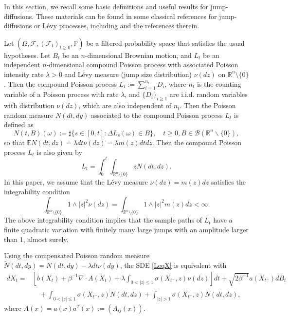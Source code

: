 \documentclass[10pt]{article}
\theoremstyle{definition}
\theoremstyle{remark}
\numberwithin{equation}{section}
\begin{document}
In this section, we recall some basic definitions and useful results for jump-diffusions. These materials can be found in some classical references for jump-diffusions or L\'{e}vy processes, including \cite{A2004, S99, K19} and the references therein.

Let $(\Omega, \mathscr{F}, (\mathscr{F}_t)_{t\geq 0}, \mathbb{P})$ be a filtered probability space that satisfies the usual hypotheses.
Let $B_t$ be an $n$-dimensional Brownian motion, and $L_{t}$ be an independent $n$-dimensional compound Poisson process with associated Poisson intensity rate $\lambda>0$ and L\'{e}vy measure (jump size distribution) $\nu(dz)$ on $\mathbb{R}^n \setminus\{0\}$. Then the compound Poisson process $L_t := \sum_{i=1}^{n_t}D_i$, where $n_t$ is the counting variable of a Poisson process with rate $\lambda$, and $\{D_i\}_{i\geq 1}$ are i.i.d. random variables with distribution $\nu(dz)$, which are also independent of $n_t$. Then the Poisson random measure $N(dt,dy)$ associated to the compound Poisson process $L_t$ is defined as
\begin{equation*}
    N(t,B)(\omega):= \sharp \{s\in [0,t]:\Delta L_{s}(\omega) \in B\}, \quad t\geq 0, B\in \mathscr{B}(\mathbb{R}^{n}\backslash \{0\}),
\end{equation*}
so that $\mathbb{E}N(dt,dz) = \lambda dt\nu(dz) = \lambda m(z)dtdz$. Then the compound Poisson process $L_t$ is also given by
\begin{equation*}
    L_{t} = \int_{0}^t\int_{\mathbb{R}^n \setminus \{0\}} z N(dt,dz).
\end{equation*}
In this paper, we assume that the L\'{e}vy measure $\nu(dz)=m(z)dz$ satisfies the integrability condition
\begin{equation}\label{integrability}
    \int_{\mathbb{R}^n \setminus\{0\}} 1\wedge |z|^2 \nu(dz) = \int_{\mathbb{R}^n \setminus\{0\}} 1\wedge |z|^2 m(z)dz < \infty.
\end{equation}
The above integrability condition implies that the sample paths of $L_t$ have a finite quadratic variation with finitely many large jumps with an amplitude larger than 1, almost surely.

Using the compensated Poisson random measure $\widetilde{N}(dt,dy)=N(dt,dy)- \lambda dt\nu(dy)$, the SDE \eqref{LeqX} is equivalent with
\begin{align}
 dX_t = & \left[ b(X_{t}) + \beta^{-1}\nabla \cdot A(X_t) + \lambda\int_{0< |z| \leq 1} \sigma(X_{t^-},z) \nu(dz) \right]dt + \sqrt{2\beta^{-1}} a(X_{t^-})dB_t \nonumber \\
 & \quad + \int_{0<|z| \leq 1} \sigma(X_{t^{-}},z)\widetilde{N}(dt,dz) + \int_{|z|>1} \sigma(X_{t^{-}},z) N(dt,dz),
\end{align}
where $A(x) = a(x)a^T(x):= (A_{ij}(x))$.
\end{document}
